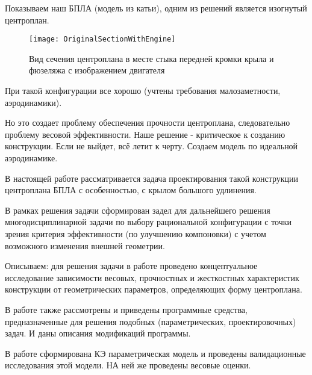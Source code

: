 Показываем наш БПЛА (модель из катьи), одним из решений является изогнутый центроплан.

\begin{figure}[ht]
\captionsetup{justification=centering}
\centering
\texttt{[image: OriginalSectionWithEngine]}
\caption{Вид сечения центроплана в месте стыка передней кромки крыла и фюзеляжа с изображением двигателя}
\label{fig:OriginalSectionWithEngine}
\end{figure}


При такой конфигурации все хорошо (учтены требования малозаметности, аэродинамики).

Но это создает проблему обеспечения прочности центроплана, следовательно проблему весовой эффективности. Наше решение - критическое к созданию конструкции. Если не выйдет, всё летит к черту. Создаем модель по идеальной аэродинамике.

В настоящей работе рассматривается задача проектирования такой конструкции центроплана БПЛА с особенностью, с крылом большого удлинения.

В рамках решения задачи сформирован задел для дальнейшего решения многодисциплинарной задачи по выбору рациональной конфигурации с точки зрения критерия эффективности (по улучшению компоновки) с учетом возможного изменения внешней геометрии.

Описываем: для решения задачи в работе проведено концептуальное исследование зависимости весовых, прочностных и жесткостных характеристик конструкции от геометрических параметров, определяющих форму центроплана.

В работе также рассмотрены и приведены программные средства, предназначенные для решения подобных (параметрических, проектировочных) задач. И даны описания модификаций программы.

В работе сформирована КЭ параметрическая модель и проведены валидационные исследования этой модели. НА ней же проведены весовые оценки. 

 